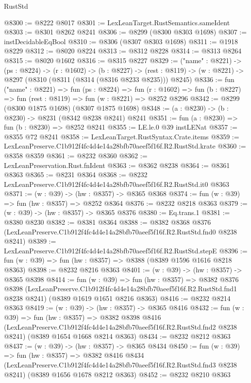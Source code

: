 \begin{lexlean}{RustStd}
\begin{coremodule}
@8300 := @8222 @8017
@8301 := LexLeanTarget.RustSemantics.sameIdent
@8303 := @8301 @8262 @8241
@8306 := @8299 (@8300 @8303 @1698)
@8307 := instDecidableEqBool
@8310 := @8306 (@8307 @8303 @1698)
@8311 := @1918 @8229
@8312 := @8020 @8224
@8313 := @8312 @8228
@8314 := @8313 @8264
@8315 := @8020 @1602
@8316 := @8315 @8227
@8329 := ("name" : @8221) ->
  (ps : @8224) ->
  (r : @1602) ->
  (b : @8227) ->
  (rest : @8119) -> (w : @8221) -> @8297 (@8310 (@8311 (@8314 (@8316 @8233 @8235))) @8245)
@8336 := fun ("name" : @8221) =>
  fun (ps : @8224) =>
  fun (r : @1602) => fun (b : @8227) => fun (rest : @8119) => fun (w : @8221) => @8252 @8296
@8342 := @8299 (@8300 @1875 @1698) (@8307 @1875 @1698)
@8348 := (a : @8230) -> (b : @8230) -> @8231 (@8342 @8238 @8241) @8241
@8351 := fun (a : @8230) => fun (b : @8230) => @8252 @8241
@8355 := LE.le.{0} @39 instLENat
@8357 := @8355 @72 @8241
@8358 := LexLeanTarget.RustSyntax.Crate.items
@8359 := LexLeanPreserve.C1b912f4fc4d4e14a28bfb70aeef5f16f.R2.RustStd.krate
@8360 := @8358 @8359
@8361 := @8232 @8360
@8362 := LexLeanPreservation.Rust.fnIdent
@8363 := @8362 @8238
@8364 := @8361 @8363
@8365 := @8231 @8364
@8368 := @8232 LexLeanPreserve.C1b912f4fc4d4e14a28bfb70aeef5f16f.R2.RustStd.it0 @8363
@8371 := (w : @39) -> (hw : @8357) -> @8365 @8368
@8374 := fun (w : @39) => fun (hw : @8357) => @8252 @8364
@8376 := @8232 @8218 @8363
@8379 := (w : @39) -> (hw : @8357) -> @8365 @8376
@8380 := Eq.trans.{1}
@8381 := @8380 @8230
@8382 := @8381 @8364
@8388 := @8382
    @8368
    @8376
    (LexLeanPreserve.C1b912f4fc4d4e14a28bfb70aeef5f16f.R2.RustStd.fnd0 @8238 @8241)
@8389 := LexLeanPreserve.C1b912f4fc4d4e14a28bfb70aeef5f16f.R2.RustStd.stepE
@8396 := fun (w : @39) => fun (hw : @8357) => @8388 (@8389 @1596 @1616 @8218 @8363)
@8398 := @8232 @8216 @8363
@8401 := (w : @39) -> (hw : @8357) -> @8365 @8398
@8414 := fun (w : @39) =>
  fun (hw : @8357) =>
  @8382
    @8376
    @8398
    (LexLeanPreserve.C1b912f4fc4d4e14a28bfb70aeef5f16f.R2.RustStd.fnd1 @8238 @8241)
    (@8389 @1619 @1651 @8216 @8363)
@8416 := @8232 @8214 @8363
@8419 := (w : @39) -> (hw : @8357) -> @8365 @8416
@8432 := fun (w : @39) =>
  fun (hw : @8357) =>
  @8382
    @8398
    @8416
    (LexLeanPreserve.C1b912f4fc4d4e14a28bfb70aeef5f16f.R2.RustStd.fnd2 @8238 @8241)
    (@8389 @1654 @1668 @8214 @8363)
@8434 := @8232 @8212 @8363
@8437 := (w : @39) -> (hw : @8357) -> @8365 @8434
@8450 := fun (w : @39) =>
  fun (hw : @8357) =>
  @8382
    @8416
    @8434
    (LexLeanPreserve.C1b912f4fc4d4e14a28bfb70aeef5f16f.R2.RustStd.fnd3 @8238 @8241)
    (@8389 @1656 @1678 @8212 @8363)
@8452 := @8232 @8210 @8363

\end{coremodule}
\end{lexlean}
